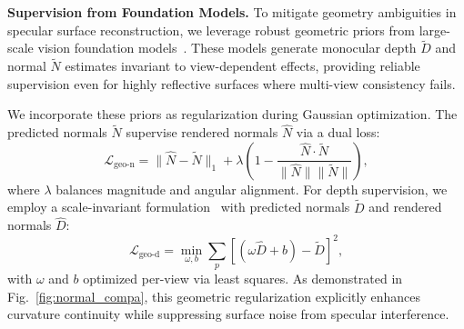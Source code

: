 \noindent\textbf{Supervision from Foundation Models.}
To mitigate geometry ambiguities in specular surface reconstruction, we leverage robust geometric priors from large-scale vision foundation models~\cite{Ke_Obukhov_Huang_Metzger_Daudt_Schindler_2023, garcia2025fine}. These models generate monocular depth $\tilde{D}$ and normal $\tilde{N}$ estimates invariant to view-dependent effects, providing reliable supervision even for highly reflective surfaces where multi-view consistency fails.

We incorporate these priors as regularization during Gaussian optimization. The predicted normals $\tilde{N}$ supervise rendered normals $\hat{N}$ via a dual loss:
\begin{equation}
\label{eq:L-geo-n}
\mathcal{L}_{\text{geo-n}} = \|\hat{N} - \tilde{N}\|_1 + \lambda \left(1 - \frac{\hat{N} \cdot \tilde{N}}{\|\hat{N}\| \|\tilde{N}\|}\right),
\end{equation}
where $\lambda$ balances magnitude and angular alignment. For depth supervision, we employ a scale-invariant formulation~\cite{ranftl2020towards} with predicted normals $\tilde{D}$ and rendered normals $\hat{D}$:
\begin{equation}
\label{eq:L-geo-d}
\mathcal{L}_{\text{geo-d}} = \min_{\omega, b} \sum_{p} \left[ (\omega \hat{D} + b) - \tilde{D} \right]^2,
\end{equation}
with $\omega$ and $b$ optimized per-view via least squares. As demonstrated in Fig.~\ref{fig:normal_compa}, this geometric regularization explicitly enhances curvature continuity while suppressing surface noise from specular interference.

